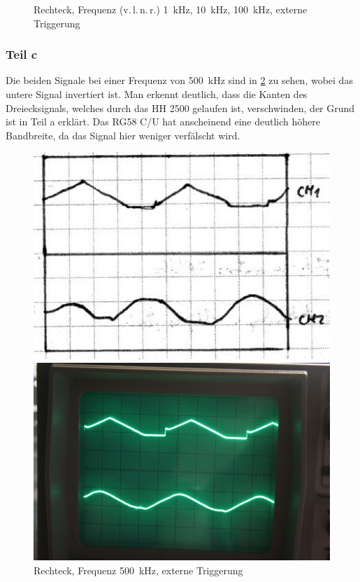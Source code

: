 \begin{figure}[htbp]
	\caption{%
		Rechteck, Frequenz (v.\,l.\,n.\,r.) \SI{1}{\kilo\hertz}, \SI{10}{\kilo\hertz},
		\SI{100}{\kilo\hertz}, externe Triggerung
	}
	\label{fig:0776-0778}
\end{figure}

\subsubsection{Teil c}

Die beiden Signale bei einer Frequenz von \SI{500}{\kilo\hertz} sind in 
\ref{fig:0779} zu sehen, wobei das untere Signal invertiert ist. Man erkennt deutlich, dass die Kanten des Dreiecksignals, welches durch das HH 2500 gelaufen ist, verschwinden, der Grund ist in Teil a erklärt. Das RG58 C/U hat anscheinend eine deutlich höhere Bandbreite, da das Signal hier weniger verfälscht wird.

\begin{figure}[htbp]
	\centering
	\begin{minipage}{.45\linewidth}
	\includegraphics[width=\linewidth]{Skizzen/IMG_0779-1500.jpg}
	\end{minipage}
	\hfill
	\begin{minipage}{.45\linewidth}
	\includegraphics[width=\linewidth]{Fotos/IMG_0779-1500.jpg}
	\end{minipage}
	\caption{%
		Rechteck, Frequenz \SI{500}{\kilo\hertz},
		externe Triggerung
	}
	\label{fig:0779}
\end{figure}

